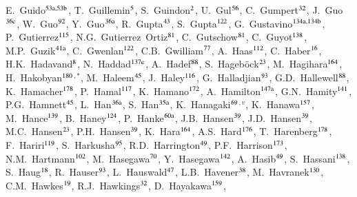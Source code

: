 \begin{flushleft}
E.~Guido$^\textrm{\scriptsize 53a,53b}$,
T.~Guillemin$^\textrm{\scriptsize 5}$,
S.~Guindon$^\textrm{\scriptsize 2}$,
U.~Gul$^\textrm{\scriptsize 56}$,
C.~Gumpert$^\textrm{\scriptsize 32}$,
J.~Guo$^\textrm{\scriptsize 36c}$,
W.~Guo$^\textrm{\scriptsize 92}$,
Y.~Guo$^\textrm{\scriptsize 36a}$,
R.~Gupta$^\textrm{\scriptsize 43}$,
S.~Gupta$^\textrm{\scriptsize 122}$,
G.~Gustavino$^\textrm{\scriptsize 134a,134b}$,
P.~Gutierrez$^\textrm{\scriptsize 115}$,
N.G.~Gutierrez~Ortiz$^\textrm{\scriptsize 81}$,
C.~Gutschow$^\textrm{\scriptsize 81}$,
C.~Guyot$^\textrm{\scriptsize 138}$,
M.P.~Guzik$^\textrm{\scriptsize 41a}$,
C.~Gwenlan$^\textrm{\scriptsize 122}$,
C.B.~Gwilliam$^\textrm{\scriptsize 77}$,
A.~Haas$^\textrm{\scriptsize 112}$,
C.~Haber$^\textrm{\scriptsize 16}$,
H.K.~Hadavand$^\textrm{\scriptsize 8}$,
N.~Haddad$^\textrm{\scriptsize 137e}$,
A.~Hadef$^\textrm{\scriptsize 88}$,
S.~Hageb\"ock$^\textrm{\scriptsize 23}$,
M.~Hagihara$^\textrm{\scriptsize 164}$,
H.~Hakobyan$^\textrm{\scriptsize 180}$$^{,*}$,
M.~Haleem$^\textrm{\scriptsize 45}$,
J.~Haley$^\textrm{\scriptsize 116}$,
G.~Halladjian$^\textrm{\scriptsize 93}$,
G.D.~Hallewell$^\textrm{\scriptsize 88}$,
K.~Hamacher$^\textrm{\scriptsize 178}$,
P.~Hamal$^\textrm{\scriptsize 117}$,
K.~Hamano$^\textrm{\scriptsize 172}$,
A.~Hamilton$^\textrm{\scriptsize 147a}$,
G.N.~Hamity$^\textrm{\scriptsize 141}$,
P.G.~Hamnett$^\textrm{\scriptsize 45}$,
L.~Han$^\textrm{\scriptsize 36a}$,
S.~Han$^\textrm{\scriptsize 35a}$,
K.~Hanagaki$^\textrm{\scriptsize 69}$$^{,v}$,
K.~Hanawa$^\textrm{\scriptsize 157}$,
M.~Hance$^\textrm{\scriptsize 139}$,
B.~Haney$^\textrm{\scriptsize 124}$,
P.~Hanke$^\textrm{\scriptsize 60a}$,
J.B.~Hansen$^\textrm{\scriptsize 39}$,
J.D.~Hansen$^\textrm{\scriptsize 39}$,
M.C.~Hansen$^\textrm{\scriptsize 23}$,
P.H.~Hansen$^\textrm{\scriptsize 39}$,
K.~Hara$^\textrm{\scriptsize 164}$,
A.S.~Hard$^\textrm{\scriptsize 176}$,
T.~Harenberg$^\textrm{\scriptsize 178}$,
F.~Hariri$^\textrm{\scriptsize 119}$,
S.~Harkusha$^\textrm{\scriptsize 95}$,
R.D.~Harrington$^\textrm{\scriptsize 49}$,
P.F.~Harrison$^\textrm{\scriptsize 173}$,
N.M.~Hartmann$^\textrm{\scriptsize 102}$,
M.~Hasegawa$^\textrm{\scriptsize 70}$,
Y.~Hasegawa$^\textrm{\scriptsize 142}$,
A.~Hasib$^\textrm{\scriptsize 49}$,
S.~Hassani$^\textrm{\scriptsize 138}$,
S.~Haug$^\textrm{\scriptsize 18}$,
R.~Hauser$^\textrm{\scriptsize 93}$,
L.~Hauswald$^\textrm{\scriptsize 47}$,
L.B.~Havener$^\textrm{\scriptsize 38}$,
M.~Havranek$^\textrm{\scriptsize 130}$,
C.M.~Hawkes$^\textrm{\scriptsize 19}$,
R.J.~Hawkings$^\textrm{\scriptsize 32}$,
D.~Hayakawa$^\textrm{\scriptsize 159}$,

\end{flushleft}
